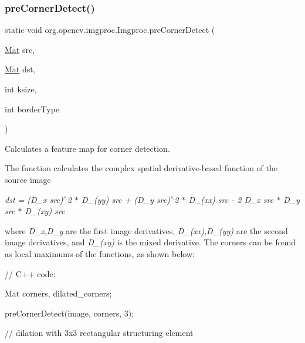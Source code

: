 \subsubsection{\texorpdfstring{pre\+Corner\+Detect()}{preCornerDetect()}\hspace{0.1cm}{\footnotesize\ttfamily [1/2]}}
{\footnotesize\ttfamily static void org.\+opencv.\+imgproc.\+Imgproc.\+pre\+Corner\+Detect (\begin{DoxyParamCaption}\item[{\mbox{\hyperlink{classorg_1_1opencv_1_1core_1_1_mat}{Mat}}}]{src,  }\item[{\mbox{\hyperlink{classorg_1_1opencv_1_1core_1_1_mat}{Mat}}}]{dst,  }\item[{int}]{ksize,  }\item[{int}]{border\+Type }\end{DoxyParamCaption})\hspace{0.3cm}{\ttfamily [static]}}

Calculates a feature map for corner detection.

The function calculates the complex spatial derivative-\/based function of the source image

{\itshape dst = (D\+\_\+x src)$^\wedge$2 $\ast$ D\+\_\+(yy) src + (D\+\_\+y src)$^\wedge$2 $\ast$ D\+\_\+(xx) src -\/ 2 D\+\_\+x src $\ast$ D\+\_\+y src $\ast$ D\+\_\+(xy) src}

where {\itshape D\+\_\+x},{\itshape D\+\_\+y} are the first image derivatives, {\itshape D\+\_\+(xx)},{\itshape D\+\_\+(yy)} are the second image derivatives, and {\itshape D\+\_\+(xy)} is the mixed derivative. The corners can be found as local maximums of the functions, as shown below\+: {\ttfamily }

{\ttfamily }

{\ttfamily }

{\ttfamily // C++ code\+:}

{\ttfamily }

{\ttfamily }

{\ttfamily Mat corners, dilated\+\_\+corners;}

{\ttfamily }

{\ttfamily }

{\ttfamily pre\+Corner\+Detect(image, corners, 3);}

{\ttfamily }

{\ttfamily }

{\ttfamily // dilation with 3x3 rectangular structuring element}

{\ttfamily }

